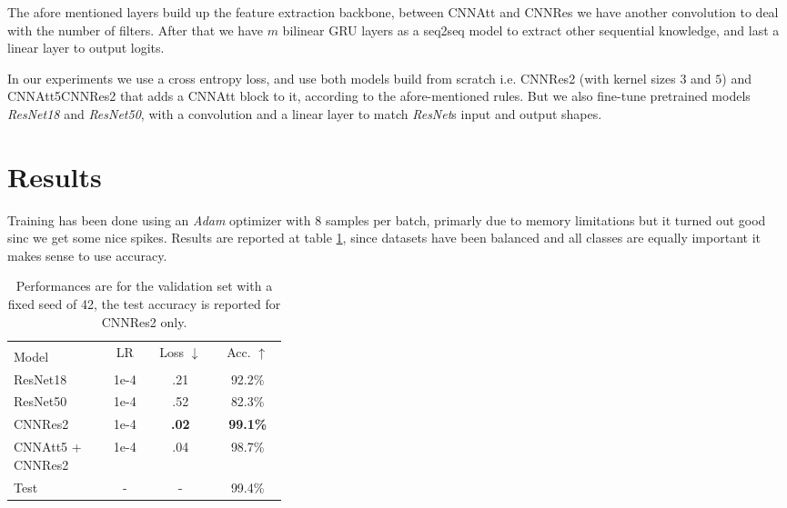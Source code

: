 \documentclass{article}
\begin{document}
The afore mentioned layers build up the feature extraction backbone, between CNNAtt and CNNRes we have another convolution to deal with the number of filters.
After that we have $m$ bilinear GRU layers as a seq2seq model to extract other sequential knowledge, and last a linear layer to output logits.

In our experiments we use a cross entropy loss, and use both models build  from scratch i.e. CNNRes2 (with kernel sizes $3$ and $5$) and CNNAtt5CNNRes2 that adds a CNNAtt block to it, according to the afore-mentioned rules.
But we also fine-tune pretrained models \textit{ResNet18} and \textit{ResNet50}, with a convolution and a linear layer to match \textit{ResNet}s input and output shapes.

\section{Results}
Training has been done using an \textit{Adam} optimizer with $8$ samples per batch, primarly due to memory limitations but it turned out good sinc we get some nice spikes.
Results are reported at table \ref{tab:joint-results}, since datasets have been balanced and all classes are equally important it makes sense to use accuracy.

\begin{table}[h!]
    \caption{Performances are for the validation set with a fixed seed of 42, the test accuracy is reported for CNNRes2 only.}
    \label{tab:joint-results}
    \begin{center}
        \begin{small}
            \begin{tabular}{p{0.35\linewidth} | ccc}
                \toprule
                & \multirow{2}{0.13\linewidth}{LR} 
                & \multirow{2}{0.13\linewidth}{Loss $\downarrow$} 
                & \multirow{2}{0.13\linewidth}{Acc. $\uparrow$} \\
                Model \\
                \midrule
                ResNet18 & 1e-4 & .21 & 92.2\% \\
                ResNet50 & 1e-4 & .52 & 82.3\% \\
                CNNRes2 & 1e-4 & \textbf{.02} & \textbf{99.1\%} \\
                CNNAtt5 + CNNRes2 & 1e-4 & .04 & 98.7\% \\
                \midrule
                \midrule
                Test & - & - & 99.4\% \\
                \bottomrule
            \end{tabular}
        \end{small}
    \end{center}
    \vspace{-0.5cm}
\end{table}
\end{document}
